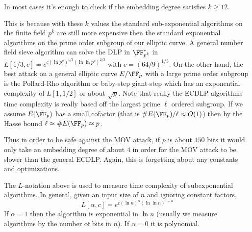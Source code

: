 \documentclass[11pt]{article}
\begin{document}
\begin{rem}
	In most cases it's enough to check if the embedding degree satisfies $k\geq 12$.
	
	This is because with these $k$ values the standard sub-exponential algorithms on the finite field $p^k$ are still more expensive then the standard exponential algorithms on the prime order subgroup of our elliptic curve. A general number field sieve algorithm can solve the DLP in $\FF_{p^k}^*$ in $L[1/3,c] = e^{c(\ln p^k)^{1/3}(\ln\ln p^k)^{2/3}}$ with $c = (64/9)^{1/3}$. On the other hand, the best attack on a general elliptic curve $E/\FF_p$ with a large prime order subgroup is the Pollard-Rho algorithm or baby-step giant-step which has an exponential complexity of $L[1,1/2]$ or about $\sqrt{p}$. Note that really the ECDLP algorithms time complexity is really based off the largest prime $\ell$ ordered subgroup. If we assume $E(\FF_p)$ has a small cofactor (that is $\#E(\FF_p)/\ell \approx O(1)$) then by the Hasse bound $\ell\approx \#E(\FF_p) \approx p$.
	
	Thus in order to be safe against the MOV attack, if $p$ is about $150$ bits it would only take an embedding degree of about $4$ in order for the MOV attack to be slower than the general ECDLP. Again, this is forgetting about any constants and optimizations.
%	
\end{rem}

\begin{rem}
	The $L$-notation above is used to measure time complexity of subexponential algorithms. In general, given an input size of $n$ and ignoring constant factors,
	$$
	L[\alpha,c] = e^{c(\ln n)^\alpha(\ln\ln n)^{1 - \alpha}}
	$$
	If $\alpha = 1$ then the algorithm is exponential in $\ln n$ (usually we measure algorithms by the number of bits in $n$). If $\alpha = 0$ it is polynomial.
\end{rem}
\end{document}
